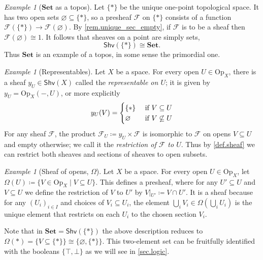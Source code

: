 \documentclass[11pt, oneside, article]{memoir}
\theoremstyle{plain}
\theoremstyle{definition}
\theoremstyle{remark}
\newtheorem{example}[theorem]{Example}
\renewcommand{\ss}{\subseteq}
\newcommand{\Set}[1]{\mathrm{#1}}
\newcommand{\Cat}[1]{\mathbf{#1}}
\newcommand{\fun}[1]{\mathcal{#1}}
\newcommand{\Fun}[1]{\mathsf{#1}}
\newcommand{\sheaf}[1]{\fun{#1}}
\newcommand{\smset}{\Cat{Set}}
\newcommand{\tn}[1]{\textnormal{#1}}
\newcommand{\shv}{\Fun{Shv}}
\newcommand{\Op}{\Set{Op}}
\newcommand{\rest}[2]{#1\big|\hspace{0in}_{#2}}
\newcommand{\true}{\top}
\newcommand{\false}{\bot}
\begin{document}
\begin{example}[$\smset$ as a topos]\label{ex.set_topos}
Let $\{*\}$ be the unique one-point topological space. It has two open sets $\varnothing\ss\{*\}$, so a presheaf $\sheaf{F}$ on $\{*\}$ consists of a function $\sheaf{F}(\{*\})\to\sheaf{F}(\varnothing)$. By \cref{rem.unique_sec_empty}, if $\sheaf{F}$ is to be a sheaf then $\sheaf{F}(\varnothing)\cong 1$. It follows that sheaves on a point are simply sets,
\[
\shv(\{*\})\cong\smset.
\]
Thus $\smset$ is an example of a topos, in some sense the primordial one.
\end{example}

\begin{example}[Representables]\label{ex.representable_sheaf}
Let $X$ be a space. For every open $U\in\Op_X$, there is a sheaf $y_U\in\shv(X)$ called the \emph{representable on $U$}; it is given by $y_U=\Op_X(-,U)$, or more explicitly
\[
	y_U(V)=
	\begin{cases}
	\{*\}&\tn{ if }V\ss U\\
	\varnothing&\tn{ if }V\not\ss U
	\end{cases}
\]
For any sheaf $\sheaf{F}$, the product $\sheaf{F}_U\coloneqq y_U\times\sheaf{F}$ is isomorphic to $\sheaf{F}$ on opens $V\ss U$ and empty otherwise; we call it the \emph{restriction of $\sheaf{F}$ to $U$}. Thus by \cref{def.sheaf} we can restrict both sheaves and sections of sheaves to open subsets.
\end{example}

\begin{example}[Sheaf of opens, $\Omega$]\label{ex.subobject_classifier}
Let $X$ be a space. For every open $U\in\Op_X$, let $\Omega(U)\coloneqq\{V\in\Op_X\mid V\ss U\}$. This defines a presheaf, where for any $U'\ss U$ and $V\ss U$ we define the restriction of $V$ to $U'$ by $\rest{V}{U'}\coloneqq V\cap U'$. It is a sheaf because for any $(U_i)_{i\in I}$ and choices of $V_i\ss U_i$, the element $\bigcup_iV_i\in\Omega(\bigcup_i U_i)$ is the unique element that restricts on each $U_i$ to the chosen section $V_i$.

Note that in $\smset=\shv(\{*\})$ the above description reduces to $\Omega(*)=\{V\ss\{*\}\}\cong\{\varnothing,\{*\}\}$. This two-element set can be fruitfully identified with the booleans $\{\true,\false\}$ as we will see in \cref{sec.logic}.
\end{example}
\end{document}
